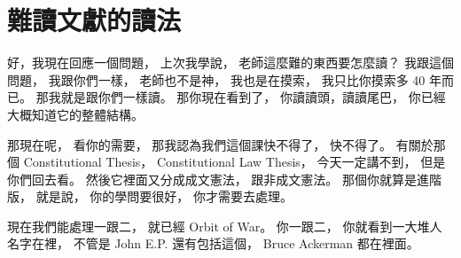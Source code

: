 \section{難讀文獻的讀法}

\hypertarget{w02:cue:873}{}好，我現在回應一個問題，
\hypertarget{w02:cue:874}{}上次我學說，
\hypertarget{w02:cue:875}{}老師這麼難的東西要怎麼讀？
\hypertarget{w02:cue:876}{}我跟這個問題，
\hypertarget{w02:cue:877}{}我跟你們一樣，
\hypertarget{w02:cue:878}{}老師也不是神，
\hypertarget{w02:cue:879}{}我也是在摸索，
\hypertarget{w02:cue:880}{}我只比你摸索多 40 年而已。
\hypertarget{w02:cue:881}{}那我就是跟你們一樣讀。
\hypertarget{w02:cue:882}{}那你現在看到了，
\hypertarget{w02:cue:883}{}你讀讀頭，讀讀尾巴，
\hypertarget{w02:cue:884}{}你已經大概知道它的整體結構。

\hypertarget{w02:cue:885}{}那現在呢，
\hypertarget{w02:cue:886}{}看你的需要，
\hypertarget{w02:cue:887}{}那我認為我們這個課快不得了，
\hypertarget{w02:cue:888}{}快不得了。
\hypertarget{w02:cue:889}{}有關於那個 Constitutional Thesis，
\hypertarget{w02:cue:890}{}Constitutional Law Thesis，
\hypertarget{w02:cue:891}{}今天一定講不到，
\hypertarget{w02:cue:892}{}但是你們回去看。
\hypertarget{w02:cue:893}{}然後它裡面又分成成文憲法，
\hypertarget{w02:cue:894}{}跟非成文憲法。
\hypertarget{w02:cue:895}{}那個你就算是進階版，
\hypertarget{w02:cue:896}{}就是說，
\hypertarget{w02:cue:897}{}你的學問要很好，
\hypertarget{w02:cue:898}{}你才需要去處理。

\hypertarget{w02:cue:899}{}現在我們能處理一跟二，
\hypertarget{w02:cue:900}{}就已經 Orbit of War。
\hypertarget{w02:cue:901}{}你一跟二，
\hypertarget{w02:cue:902}{}你就看到一大堆人名字在裡，
\hypertarget{w02:cue:903}{}不管是 John E.P.
\hypertarget{w02:cue:904}{}還有包括這個，
\hypertarget{w02:cue:905}{}Bruce Ackerman 都在裡面。

